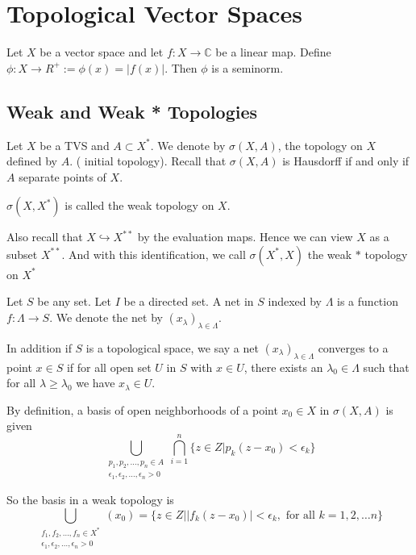 
\chapter{Topological Vector Spaces}

\begin{example}
  Let $X$ be a vector space and let $f: X \to \mathbb{C}$ be a linear
  map. Define $\phi: X \to R^{+} := \phi(x) = |f(x)|$. Then $\phi$ is
  a seminorm.
\end{example}

\section{Weak and Weak * Topologies}
\begin{remark}
  Let $X$ be a TVS and $A \subset X^{*}$. We denote by $ \sigma(X,
  A)$, the topology on $X$ defined by $A$. ( initial topology).
  Recall that $\sigma(X, A)$ is Hausdorff if and only if $A$ separate
  points of $X$.

  $\sigma(X, X^{*})$ is called the weak topology on $X$.

  Also recall that $X \hookrightarrow X^{**}$ by the evaluation maps.
  Hence we can view $X$ as a subset $X^{**}$. And with this
  identification, we call $\sigma(X^{*}, X)$ the weak $*$ topology on $X^{*}$

\end{remark}

\begin{definition}
  Let $S$ be any set. Let $I$ be a directed set. A net in $S$ indexed
  by $\Lambda$ is a function $f:\Lambda \to S$. We denote the net by
  $(x_\lambda)_{\lambda \in \Lambda}$.


  In addition if $S$ is a topological space, we say a net
  $(x_\lambda)_{\lambda \in \Lambda}$ converges to a point $x \in S$
  if  for all open set $U$ in $S$ with $x \in U$, there exists an
  $\lambda_0 \in \Lambda$ such that for all $\lambda \ge \lambda_0$
  we have $x_\lambda \in U$.
\end{definition}

\begin{remark}
  By definition, a basis of open neighborhoods of a point $x_0 \in X$
  in $\sigma(X, A)$ is given \[
    \bigcup_{\substack{p_1 , p_2 , \ldots , p_n \in A \\ \epsilon_1 ,
    \epsilon_2 , \ldots , \epsilon_n > 0}}\bigcap_{i = 1}^{n} \{ z
    \in Z | p_k(z-x_0) < \epsilon_k \}
  \]

  So the basis in a weak topology is \[
    \bigcup_{\substack{f_1 , f_2 , \ldots , f_n \in X^{*} \\ \epsilon_1 ,
    \epsilon_2 , \ldots , \epsilon_n > 0}}(x_0) = \{  z \in Z \Big|
    |f_k(z- x_0)|< \epsilon_k, \textrm{ for all } k = 1, 2, \ldots n \}
  \]
\end{remark}

